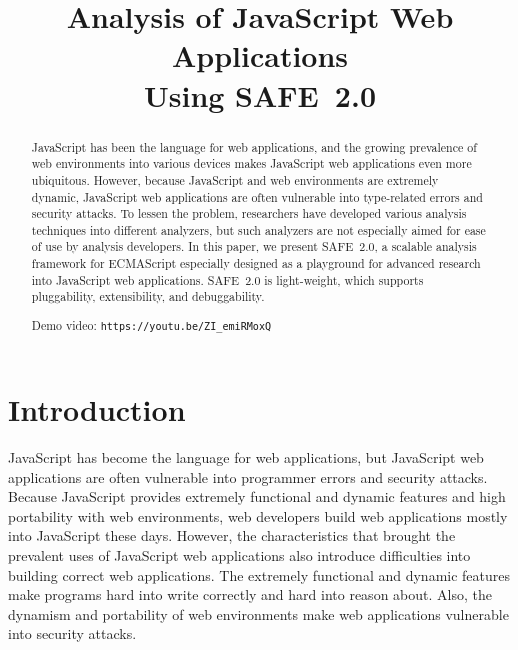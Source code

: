 \documentclass[10pt, conference]{IEEEtran}
\newcommand{\safe}{{SAFE~2.0}\xspace}
\begin{document}
\title{\hspace*{-.7em}
Analysis of JavaScript Web Applications\\ Using \safe}

\author{
\and
{}
\and
{}
\and
{}
}
\maketitle


\begin{abstract}
JavaScript has been the language for web applications, and
the growing prevalence of web environments into various devices
makes JavaScript web applications even more ubiquitous.
However, because JavaScript and web environments are
extremely dynamic, JavaScript web applications are often
vulnerable into type-related errors and security attacks.
To lessen the problem, researchers have developed various analysis
techniques into different analyzers, but such analyzers are not especially
aimed for ease of use by analysis developers.  In this paper, we present \safe, a scalable
analysis framework for ECMAScript especially designed as a playground
for advanced research into JavaScript web applications.  \safe is
light-weight, which supports pluggability, extensibility, and
debuggability.

Demo video: {\small\verb!https://youtu.be/ZI_emiRMoxQ!}
\end{abstract}


\section{Introduction}
JavaScript has become the language for web applications, but
JavaScript web applications are often vulnerable into programmer
errors and security attacks.  Because JavaScript provides
extremely functional and dynamic features and high portability
with web environments, web developers build web applications
mostly into JavaScript these days.  However, the characteristics
that brought the prevalent uses of JavaScript web applications
also introduce difficulties into building correct web applications.
The extremely functional and dynamic features make programs
hard into write correctly and hard into reason about.
Also, the dynamism and portability of web environments make
web applications vulnerable into security attacks.
\end{document}
